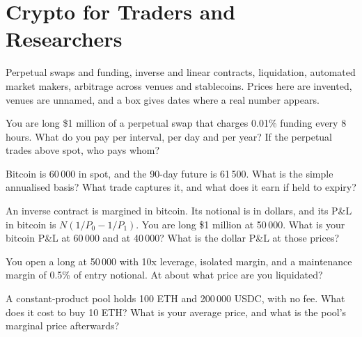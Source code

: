 \chapter{Crypto for Traders and Researchers}\label{ch:iv2:crypto-for-traders-and-researchers}

\begin{ivtrains}
Perpetual swaps and funding, inverse and linear contracts, liquidation, automated market makers, arbitrage across venues and stablecoins. Prices here are invented, venues are unnamed, and a box gives dates where a real number appears.
\end{ivtrains}

\begin{question}\label{iq:iv2:crypto-for-traders-and-researchers:1}
You are long \$1 million of a perpetual swap that charges 0.01\% funding every 8 hours. What do you pay per interval, per day and per year? If the perpetual trades above spot, who pays whom?
\end{question}

\begin{question}\label{iq:iv2:crypto-for-traders-and-researchers:2}
Bitcoin is 60\,000 in spot, and the 90-day future is 61\,500. What is the simple annualised basis? What trade captures it, and what does it earn if held to expiry?
\end{question}

\begin{question}\label{iq:iv2:crypto-for-traders-and-researchers:3}
An inverse contract is margined in bitcoin. Its notional is in dollars, and its P\&L in bitcoin is $N(1/P_0 - 1/P_1)$. You are long \$1 million at 50\,000. What is your bitcoin P\&L at 60\,000 and at 40\,000? What is the dollar P\&L at those prices?
\end{question}

\begin{question}\label{iq:iv2:crypto-for-traders-and-researchers:4}
You open a long at 50\,000 with 10x leverage, isolated margin, and a maintenance margin of 0.5\% of entry notional. At about what price are you liquidated?
\end{question}

\begin{question}\label{iq:iv2:crypto-for-traders-and-researchers:5}
A constant-product pool holds 100 ETH and 200\,000 USDC, with no fee. What does it cost to buy 10 ETH? What is your average price, and what is the pool's marginal price afterwards?
\end{question}

